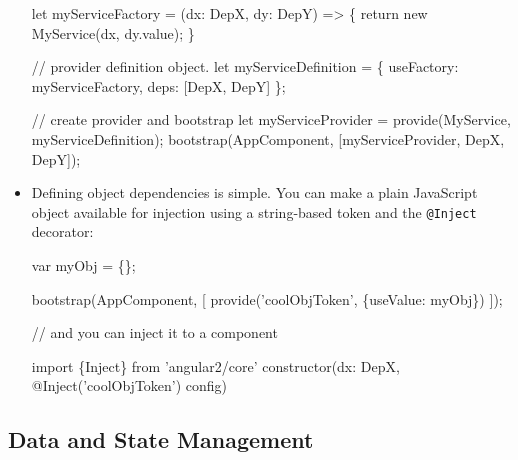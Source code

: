 \documentclass[12pt,]{article}
\newenvironment{Shaded}{}{}
\newcommand{\KeywordTok}[1]{\textcolor[rgb]{0.00,0.00,1.00}{{#1}}}
\newcommand{\CommentTok}[1]{\textcolor[rgb]{0.00,0.50,0.00}{{#1}}}
\newcommand{\FunctionTok}[1]{{#1}}
\newcommand{\NormalTok}[1]{{#1}}
\begin{document}
\begin{itemize}
\begin{Shaded}
\begin{Highlighting}[numbers=left,,]
\NormalTok{let myServiceFactory = (dx: DepX, dy: DepY) => \{}
  \KeywordTok{return} \KeywordTok{new} \FunctionTok{MyService}\NormalTok{(dx, dy.}\FunctionTok{value}\NormalTok{);}
\NormalTok{\}}

\CommentTok{// provider definition object.}
\NormalTok{let myServiceDefinition = \{}
   \NormalTok{useFactory: myServiceFactory,}
   \NormalTok{deps: [DepX, DepY]}
\NormalTok{\};}

\CommentTok{// create provider and bootstrap}
\NormalTok{let myServiceProvider = }\FunctionTok{provide}\NormalTok{(MyService, myServiceDefinition);}
\FunctionTok{bootstrap}\NormalTok{(AppComponent, [myServiceProvider, DepX, DepY]);}
\end{Highlighting}
\end{Shaded}
\item
  Defining object dependencies is simple. You can make a plain
  JavaScript object available for injection using a string-based token
  and the \texttt{@Inject} decorator:

\begin{Shaded}
\begin{Highlighting}[numbers=left,,]
\NormalTok{var myObj = \{\};}

\FunctionTok{bootstrap}\NormalTok{(AppComponent, [}
  \FunctionTok{provide}\NormalTok{('coolObjToken', \{useValue: myObj\})}
\NormalTok{]);}

\CommentTok{// and you can inject it to a component}

\KeywordTok{import} \NormalTok{\{Inject\} from 'angular2/core'}
\FunctionTok{constructor}\NormalTok{(dx: DepX, }\FunctionTok{@Inject}\NormalTok{('coolObjToken') config)}
\end{Highlighting}
\end{Shaded}
\end{itemize}

\subsection{Data and State Management}\label{data-and-state-management}
\end{document}
